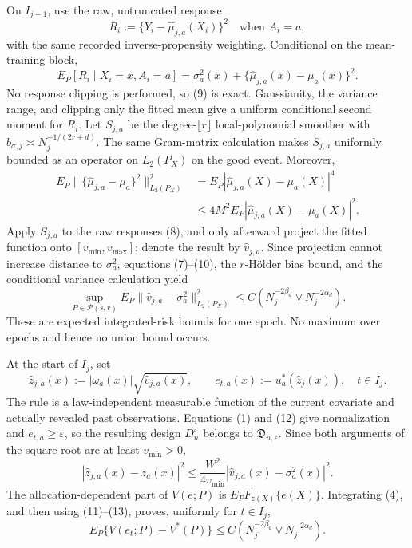 On \(I_{j-1}\), use the raw, untruncated response
\[
R_i:=\{Y_i-\widehat\mu_{j,a}(X_i)\}^2
\quad\text{when }A_i=a,
\tag{8}
\]
with the same recorded inverse-propensity weighting.  Conditional on the mean-training block,
\[
E_P[R_i\mid X_i=x,A_i=a]
=\sigma_a^2(x)+\{\widehat\mu_{j,a}(x)-\mu_a(x)\}^2.
\tag{9}
\]
No response clipping is performed, so (9) is exact.  Gaussianity, the variance range, and clipping only the fitted mean give a uniform conditional second moment for \(R_i\).  Let \(S_{j,a}\) be the degree-\(\lfloor r\rfloor\) local-polynomial smoother with
\(b_{\sigma,j}\asymp N_j^{-1/(2r+d)}\).  The same Gram-matrix calculation makes \(S_{j,a}\) uniformly bounded as an operator on \(L_2(P_X)\) on the good event.  Moreover,
\[
\begin{aligned}
E_P\|\{\widehat\mu_{j,a}-\mu_a\}^2\|_{L_2(P_X)}^2
&=E_P|\widehat\mu_{j,a}(X)-\mu_a(X)|^4\\
&\leq 4M^2E_P|\widehat\mu_{j,a}(X)-\mu_a(X)|^2.
\end{aligned}
\tag{10}
\]
Apply \(S_{j,a}\) to the raw responses (8), and only afterward project the fitted function onto \([v_{\min},v_{\max}]\); denote the result by \(\widehat v_{j,a}\).  Since projection cannot increase distance to \(\sigma_a^2\), equations (7)--(10), the \(r\)-Hölder bias bound, and the conditional variance calculation yield
\[
\sup_{P\in\mathcal P(s,r)}
E_P\|\widehat v_{j,a}-\sigma_a^2\|_{L_2(P_X)}^2
\leq C\left(N_j^{-2\beta_d}\vee N_j^{-2\alpha_d}\right).
\tag{11}
\]
These are expected integrated-risk bounds for one epoch.  No maximum over epochs and hence no union bound occurs.

At the start of \(I_j\), set
\[
\widehat z_{j,a}(x):=|\omega_a(x)|\sqrt{\widehat v_{j,a}(x)},
\qquad
e_{t,a}(x):=u_a^*(\widehat z_j(x)),\quad t\in I_j.
\tag{12}
\]
The rule is a law-independent measurable function of the current covariate and actually revealed past observations.  Equations (1) and (12) give normalization and \(e_{t,a}\geq\varepsilon\), so the resulting design \(D_n^{\circ}\) belongs to \(\mathfrak D_{n,\varepsilon}\).  Since both arguments of the square root are at least \(v_{\min}>0\),
\[
|\widehat z_{j,a}(x)-z_a(x)|^2
\leq \frac{W^2}{4v_{\min}}
|\widehat v_{j,a}(x)-\sigma_a^2(x)|^2.
\tag{13}
\]
The allocation-dependent part of \(V(e;P)\) is \(E_PF_{z(X)}\{e(X)\}\).  Integrating (4), and then using (11)--(13), proves, uniformly for \(t\in I_j\),
\[
E_P\{V(e_t;P)-V^*(P)\}
\leq C\left(N_j^{-2\beta_d}\vee N_j^{-2\alpha_d}\right).
\tag{14}
\]

